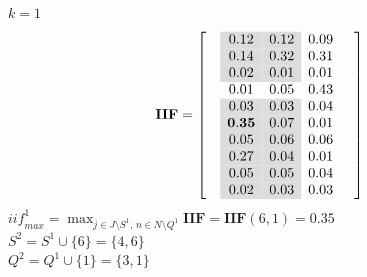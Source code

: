 \documentclass[aspectratio=149, compress]{beamer}
\newcommand\high{\cellcolor{template!20}}
\begin{document}
\begin{frame}{$k=1$}
	\vspace*{-4mm}
	\small
	\begin{equation*}
		\mathbf{IIF} =
		\left[\begin{array}{ccccc}
			&\high 0.12	  & 	\high 0.12	  & 	0.09 & \\
			&\high0.14	  & 	\high 0.32	  & 	0.31 &\\
			&\high0.02	  & 	\high 0.01	  & 	0.01 &\\
			&0.01	  &   0.05	  & 	0.43&\\
			&\high0.03	  & \high	0.03	  & 	0.04&\\
			&\high\mathbf{0.35}	  & \high	0.07	  & 	0.01&\\
			&\high0.05	  & 	\high0.06	  & 	0.06&\\
			&\high0.27	  & 	\high0.04	  & 	0.01&\\
			&\high0.05	  & 	\high0.05	  & 	0.04&\\
			&\high0.02	  & 	\high0.03	  & 	0.03 &\\
		\end{array}\right]
	\end{equation*}
	\vspace{2mm}
	$\mathit{iif}_{max}^1=\displaystyle \max_{j \in J\setminus S^1, \, n  \in N \setminus Q^1}  \mathbf{IIF} = \mathbf{IIF}(6,1)= 0.35$\\ \vspace{1.5mm}
	$S^{2} = S^1 \cup \{6\} = \{4, 6\}$\\ \vspace{1.5mm}
	$Q^{2} = Q^1 \cup \{1\} = \{3, 1\}$\\ 
\end{frame}
\end{document}
